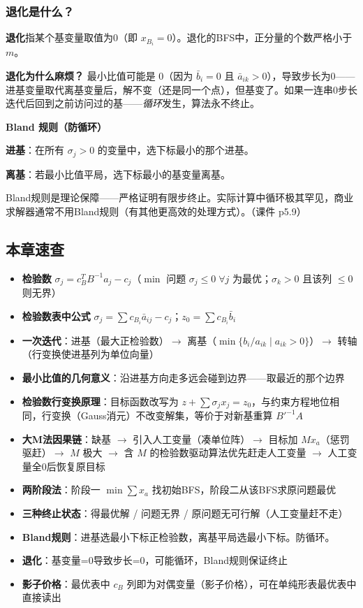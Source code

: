 \subsubsection{退化是什么？}

\textbf{退化}指某个基变量取值为0（即 $x_{B_i}=0$）。退化的BFS中，正分量的个数严格小于 $m$。

\textbf{退化为什么麻烦？} 最小比值可能是 $0$（因为 $\bar{b}_i=0$ 且 $\bar{a}_{ik}>0$），导致步长为0——进基变量取代离基变量后，解不变（还是同一个点），但基变了。如果一连串0步长迭代后回到之前访问过的基——\emph{循环}发生，算法永不终止。

\textbf{Bland 规则（防循环）}

\textbf{进基}：在所有 $\sigma_j>0$ 的变量中，选下标最小的那个进基。

\textbf{离基}：若最小比值平局，选下标最小的基变量离基。

Bland规则是理论保障——严格证明有限步终止。实际计算中循环极其罕见，商业求解器通常不用Bland规则（有其他更高效的处理方式）。（课件 p5.9）

\subsection{本章速查}

\begin{itemize}
  \item \textbf{检验数} $\sigma_j = c_B^T B^{-1} a_j - c_j$（$\min$ 问题 $\sigma_j\le 0\;\forall j$ 为最优；$\sigma_k>0$ 且该列 $\le 0$ 则无界）
  \item \textbf{检验数表中公式} $\sigma_j = \sum c_{B_i}\bar{a}_{ij} - c_j$；$z_0 = \sum c_{B_i}\bar{b}_i$
  \item \textbf{一次迭代}：进基（最大正检验数）$\to$ 离基（$\min\{b_i/a_{ik}\mid a_{ik}>0\}$）$\to$ 转轴（行变换使进基列为单位向量）
  \item \textbf{最小比值的几何意义}：沿进基方向走多远会碰到边界——取最近的那个边界
  \item \textbf{检验数行变换原理}：目标函数改写为 $z+\sum\sigma_j x_j = z_0$，与约束方程地位相同，行变换（Gauss消元）不改变解集，等价于对新基重算 $B'^{-1}A$
  \item \textbf{大M法因果链}：缺基 $\to$ 引入人工变量（凑单位阵）$\to$ 目标加 $M x_a$（惩罚驱赶）$\to$ $M$ 极大 $\to$ 含 $M$ 的检验数驱动算法优先赶走人工变量 $\to$ 人工变量全0后恢复原目标
  \item \textbf{两阶段法}：阶段一 $\min\sum x_a$ 找初始BFS，阶段二从该BFS求原问题最优
  \item \textbf{三种终止状态}：得最优解 / 问题无界 / 原问题无可行解（人工变量赶不走）
  \item \textbf{Bland规则}：进基选最小下标正检验数，离基平局选最小下标。防循环。
  \item \textbf{退化}：基变量=0导致步长=0，可能循环，Bland规则保证终止
  \item \textbf{影子价格}：最优表中 $c_B$ 列即为对偶变量（影子价格），可在单纯形表最优表中直接读出
\end{itemize}
